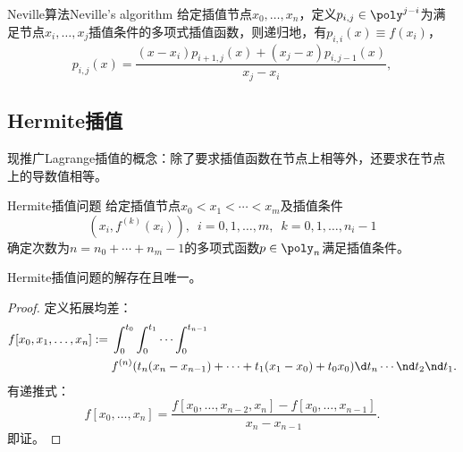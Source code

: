 \begin{theorem}
    {Neville算法}{Neville's algorithm}
    给定插值节点$x_0,\ldots,x_n$，定义$p_{i,j}\in\poly^{j-i}$为满足节点$x_i,\ldots,x_j$插值条件的多项式插值函数，则递归地，有$p_{i,i}(x)\equiv f(x_i)$，
    \begin{equation}
        \label{eqn:Neville}
        p_{i,j}(x)=\frac{(x-x_i)p_{i+1,j}(x)+(x_j-x)p_{i,j-1}(x)}{x_j-x_i},
    \end{equation}
\end{theorem}

\subsection{Hermite插值}

现推广Lagrange插值的概念：除了要求插值函数在节点上相等外，还要求在节点上的导数值相等。

\begin{definition}
    {Hermite插值问题}{}
    给定插值节点$x_0<x_1<\cdots<x_m$及插值条件
    \[
        (x_i,f^{(k)}(x_i)),\enspace i=0,1,\ldots,m,\enspace k=0,1,\ldots,n_i-1
    \]
    确定次数为$n=n_0+\cdots+n_m-1$的多项式函数$p\in\poly_n$满足插值条件。
\end{definition}

\begin{theorem}
    {}{}
    Hermite插值问题的解存在且唯一。
\end{theorem}

\begin{proof}
    定义拓展均差：
    \begin{equation}
        \begin{aligned}
            f[x_0,x_1,\ldots,x_n]:={}&\int_0^{t_0}\int_0^{t_1}\cdots\int_0^{t_{n-1}}\\
            &f^{(n)}(t_n(x_n-x_{n-1})+\cdots+t_1(x_1-x_0)+t_0x_0)\d t_n\cdots\nd t_2\nd t_1.
        \end{aligned}
    \end{equation}
    有递推式：
    \begin{equation}
        f[x_0,\ldots,x_n]=\frac{f[x_0,\ldots,x_{n-2},x_n]-f[x_0,\ldots,x_{n-1}]}{x_n-x_{n-1}}.
    \end{equation}
    即证。
\end{proof}


